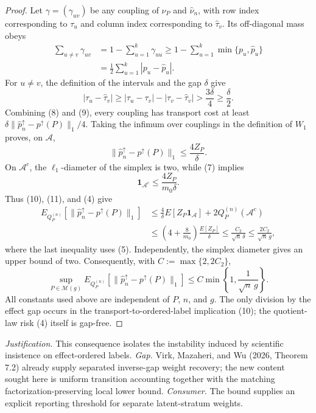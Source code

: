 \documentclass{article}
\begin{document}
\begin{proof}
Let \(\gamma=(\gamma_{uv})\) be any coupling of \(\nu_P\) and \(\widehat\nu_n\), with row index corresponding to \(\tau_u\) and column index corresponding to \(\widehat\tau_v\).  Its off-diagonal mass obeys
\[
\begin{aligned}
\sum_{u\ne v}\gamma_{uv}
&=1-\sum_{u=1}^k\gamma_{uu}
\ge1-\sum_{u=1}^k\min\{p_u,\widehat p_u\}\\
&=\frac12\sum_{u=1}^k|p_u-\widehat p_u|.
\end{aligned}                                                               \tag{8}
\]
For \(u\ne v\), the definition of the intervals and the gap \(\delta\) give
\[
|\tau_u-\widehat\tau_v|
\ge |\tau_u-\tau_v|-|\tau_v-\widehat\tau_v|
>\frac{3\delta}{4}\ge\frac{\delta}{2}.                                    \tag{9}
\]
Combining (8) and (9), every coupling has transport cost at least
\(\delta\lVert\widehat p_n^{\uparrow}-p^{\uparrow}(P)\rVert_1/4\).  Taking the infimum over couplings in the definition of \(W_1\) proves, on \(\mathcal A\),
\[
\lVert\widehat p_n^{\uparrow}-p^{\uparrow}(P)\rVert_1
\le\frac{4Z_P}{\delta}.                                                     \tag{10}
\]
On \(\mathcal A^c\), the \(\ell_1\)-diameter of the simplex is two, while (7) implies
\[
\mathbf 1_{\mathcal A^c}\le\frac{4Z_P}{m_0\delta}.                        \tag{11}
\]
Thus (10), (11), and (4) give
\[
\begin{aligned}
E_{Q_P^{(n)}}\!\left[
\lVert\widehat p_n^{\uparrow}-p^{\uparrow}(P)\rVert_1\right]
&\le \frac4\delta E[Z_P\mathbf1_{\mathcal A}]
+2Q_P^{(n)}(\mathcal A^c)\\
&\le\left(4+\frac8{m_0}\right)\frac{E[Z_P]}{\delta}
\le\frac{C_2}{\sqrt n\,\delta}
\le\frac{2C_2}{\sqrt n\,g},
\end{aligned}                                                               \tag{12}
\]
where the last inequality uses (5).  Independently, the simplex diameter gives an upper bound of two.  Consequently, with \(C:=\max\{2,2C_2\}\),
\[
\sup_{P\in\mathcal M(g)}E_{Q_P^{(n)}}\!\left[
\lVert\widehat p_n^{\uparrow}-p^{\uparrow}(P)\rVert_1\right]
\le C\min\left\{1,\frac1{\sqrt n\,g}\right\}.
\]
All constants used above are independent of \(P\), \(n\), and \(g\).  The only division by the effect gap occurs in the transport-to-ordered-label implication (10); the quotient-law risk (4) itself is gap-free.
\end{proof}
\par\smallskip\noindent \textit{Justification.} This consequence isolates the instability induced by scientific insistence on effect-ordered labels. \textit{Gap.} Virk, Mazaheri, and Wu (2026, Theorem 7.2) already supply separated inverse-gap weight recovery; the new content sought here is uniform transition accounting together with the matching factorization-preserving local lower bound. \textit{Consumer.} The bound supplies an explicit reporting threshold for separate latent-stratum weights.
\end{document}
